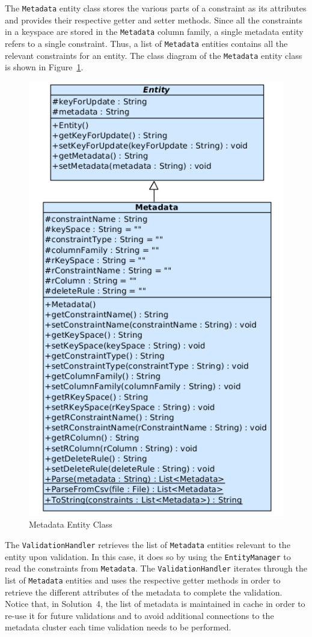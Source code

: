  
The \texttt{Metadata} entity class stores the various parts of a constraint as
its attributes and provides their respective getter and setter methods.  Since
all the constraints in a keyspace are stored in the \texttt{Metadata} column
family, a single metadata entity refers to a single constraint. Thus, a list
of \texttt{Metadata} entities contains  all the relevant constraints for an
entity. The class diagram of the \texttt{Metadata} entity class is shown in
Figure~\ref{fi:MetadataEntityClass}.

	\begin{figure}[h] 
		\centering		
		\includegraphics[width=.5\textwidth]{./figure/uml/metadata.png}
		\caption{Metadata Entity Class}\label{fi:MetadataEntityClass}
	\end{figure}
	
The \texttt{ValidationHandler} retrieves the list of \texttt{Metadata} entities
relevant to the entity upon validation.  In this case, it does so by using the
\texttt{EntityManager} to read the constraints from \texttt{Metadata}.  The
\texttt{ValidationHandler} iterates through the list of 
\texttt{Metadata} entities and uses the respective getter methods in order to
retrieve the different attributes of the metadata to complete the validation. 
Notice that, in Solution~4, the list of metadata is maintained in
cache in order to re-use it for future validations and to avoid additional 
connections to the metadata cluster each time validation needs to be 
performed.


